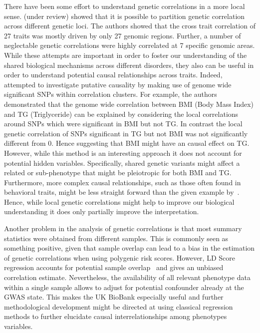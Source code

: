 There have been some effort to understand genetic correlations in a more local sense.
\citet{Shi2016a} (under review) showed that it is possible to partition genetic correlation across different genetic loci.
The authors showed that the cross trait correlation of 27 traits was mostly driven by only 27 genomic regions. 
Further, a number of neglectable genetic correlations were highly correlated at 7 specific genomic areas.
While these attempts are important in order to foster our understanding of the shared biological mechanisms across different disorders, they also can be useful in order to understand potential causal relationships across traits.
Indeed,~\citet{Shi2016a} attempted to investigate putative causality by making use of genome wide significant SNPs within correlation clusters.
For example, the authors demonstrated that the genome wide correlation between BMI (Body Mass Index) and TG (Triglyceride) can be explained by considering the local correlations around SNPs which were significant in BMI but not TG\@.
In contrast the local genetic correlation of SNPs significant in TG  but not BMI was not significantly different from $0$.
Hence suggesting that BMI might have an causal effect on TG\@.
However, while this method is an interesting approach it does not account for potential hidden variables.
Specifically, shared genetic variants might affect a related or sub-phenotype that might be pleiotropic for both BMI and TG\@.
Furthermore, more complex causal relationships, such as those often found in behavioral traits, might be less straight forward than the given example by~\citet{Shi2016a}.
Hence, while local genetic correlations might help to improve our biological understanding it does only partially improve the interpretation.

Another problem in the analysis of genetic correlations is that most summary statistics were obtained from different samples.
This is commonly seen as something positive, given that sample overlap can lead to a bias in the estimation of genetic correlations when using polygenic risk scores. 
However, LD Score regression accounts for potential sample overlap~\cite{Bulik-Sullivan2015a} and gives an unbiased correlation estimate.  
Nevertheless, the availability of all relevant phenotype data within a single sample allows to adjust for potential confounder already at the GWAS state.
This makes the UK BioBank especially useful and further methodological development might be directed at using classical regression methods to further elucidate causal interrelationships among phenotypes variables.

